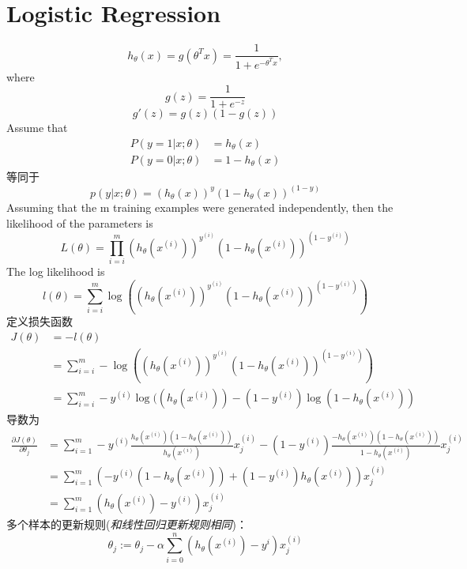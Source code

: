 \documentclass[UTF8]{ctexart}
\begin{document}
	\section{Logistic Regression}
	\begin{equation*}
		h_\theta(x)=g(\theta^Tx)=\frac{1}{1+e^{-\theta^Tx}},
	\end{equation*}
	where
	\begin{equation*}
		g(z)=\frac{1}{1+e^{-z}}
	\end{equation*}
	\begin{equation*}
		g'(z)=g(z)(1-g(z))
	\end{equation*}
	Assume that	
	\begin{equation*}
	\begin{aligned}
	P(y=1|x;\theta) & =h_\theta(x) \\
	P(y=0|x;\theta) & =1-h_\theta(x)
	\end{aligned}
	\end{equation*}
	等同于
	\begin{equation*}
		p(y|x;\theta)=(h_\theta(x))^y(1-h_\theta(x))^{(1-y)}
	\end{equation*}
	Assuming that the m training examples were generated independently, then the likelihood of the parameters is
	\begin{equation*}
		L(\theta) = \prod_{i=i}^{m}(h_\theta(x^{(i)}))^{y^{(i)}}(1-h_\theta(x^{(i)}))^{(1-y^{(i)})}
	\end{equation*}
	The log likelihood is
	\begin{equation*}
		l(\theta) = \sum_{i=i}^{m}\log((h_\theta(x^{(i)}))^{y^{(i)}}(1-h_\theta(x^{(i)}))^{(1-y^{(i)})})
	\end{equation*}
	定义损失函数
	\begin{equation*}
	\begin{aligned}
		J(\theta) &=-l(\theta) \\
		& = \sum_{i=i}^{m}-\log((h_\theta(x^{(i)}))^{y^{(i)}}(1-h_\theta(x^{(i)}))^{(1-y^{(i)})}) \\
		& = \sum_{i=i}^{m}-y^{(i)}\log((h_\theta(x^{(i)}))-(1-y^{(i)})\log(1-h_\theta(x^{(i)}))
	\end{aligned}
	\end{equation*}
	导数为
	\begin{equation*}
	\begin{aligned}
	\frac{\partial J(\theta)}{\partial \theta_j} & = \sum_{i=1}^{m}-y^{(i)}\frac{h_\theta(x^{(i)})(1-h_\theta(x^{(i)}))}{h_\theta(x^{(i)})}x_j^{(i)}-(1-y^{(i)})\frac{-h_\theta(x^{(i)})(1-h_\theta(x^{(i)}))}{1-h_\theta(x^{(i)})}x_j^{(i)} \\
	& =\sum_{i=1}^{m}(-y^{(i)}(1-h_\theta(x^{(i)}))+(1-y^{(i)})h_\theta(x^{(i)}))x_j^{(i)} \\
	& =\sum_{i=1}^{m}(h_\theta(x^{(i)})-y^{(i)})x_j^{(i)}
	\end{aligned}
	\end{equation*}
	多个样本的更新规则(\emph{和线性回归更新规则相同})：
	\begin{equation*}
	\theta_j:=\theta_j-\alpha\sum_{i=0}^{n}(h_\theta(x^{(i)})-y^i)x^{(i)}_j
	\end{equation*}
	
\end{document}
